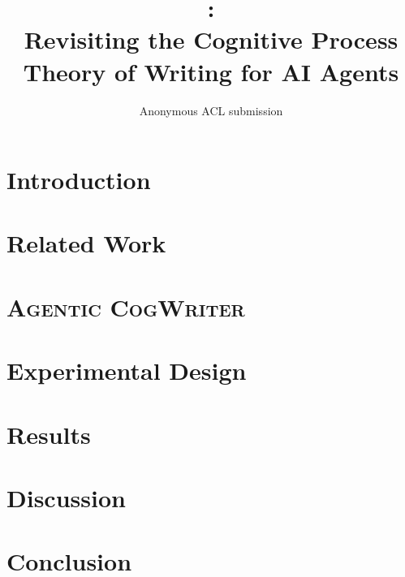 \documentclass[11pt]{article}
\title{\condAgenticCogWriter:\\Revisiting the Cognitive Process Theory of Writing for AI Agents}
\author{Anonymous ACL submission}
\newcommand{\condAgenticCogWriter}{\textsc{Agentic CogWriter}}
\begin{document}
\maketitle

\begin{abstract}

\end{abstract}

\section{Introduction}
\label{sec:introduction}


\section{Related Work}
\label{sec:related-work}


\section{\condAgenticCogWriter}
\label{sec:method}


\section{Experimental Design}
\label{sec:experimental-design}


\section{Results}
\label{sec:results}


\section{Discussion}
\label{sec:discussion}


\section{Conclusion}
\label{sec:conclusion}







\clearpage

\appendix

\onecolumn

\end{document}
